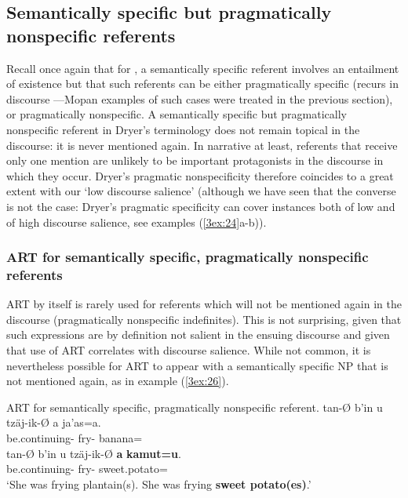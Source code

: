 \documentclass[output=paper]{langsci/langscibook}
\begin{document}
\subsection{Semantically specific but pragmatically nonspecific referents}\label{3sec:34}

Recall once again that for \cite{dryer:14}, a semantically specific referent involves an entailment of existence but that such referents can be either pragmatically specific (recurs in discourse ---Mopan examples of such cases were treated in the previous section), or pragmatically nonspecific. A semantically specific but pragmatically nonspecific referent in Dryer's terminology does not remain topical in the discourse: it is never mentioned again. In narrative at least, referents that receive only one mention are unlikely to be important protagonists in the discourse in which they occur. Dryer's pragmatic nonspecificity therefore coincides to a great extent with our `low discourse salience' (although we have seen that the converse is not the case: Dryer's pragmatic specificity can cover instances both of low and of high discourse salience, see examples (\ref{3ex:24}a-b)).

\subsubsection{ART for semantically specific, pragmatically nonspecific referents}\label{3sec:341}

ART by itself is rarely used for referents which will not be mentioned again in the discourse (pragmatically nonspecific indefinites).  This is not surprising, given that such expressions are by definition not salient in the ensuing discourse and given that use of ART correlates with discourse salience.  While not common, it is nevertheless possible for ART to appear with a semantically specific NP that is not mentioned again, as in example (\ref{3ex:26}).

\begin{exe}
\ex\label{3ex:26}
ART for semantically specific, pragmatically nonspecific referent. 
\exi{}
\gll	tan-{\O}				b'in		u		tz\"aj-ik-{\O}		a	ja'as=a. \\
	be.continuing-{}	{}	{}	fry-{}	{}	banana={} \\
\glt
\exi{}
\gll	tan-{\O}				b'in		u		tz\"aj-ik-{\O}		{\bf{a}}	{\bf{kamut=u}}. \\
	be.continuing-{}	{}	{}	fry-{}	{}		sweet.potato={} \\
\glt	`She was frying plantain(s).  She was frying {\bf{sweet potato(es)}}.'
\end{exe}
\end{document}
